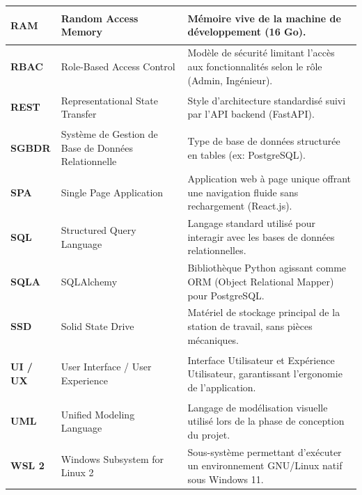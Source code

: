 \documentclass[12pt, a4paper]{report}
\begin{document}
\begin{longtable}{|p{2.5cm}|p{5.5cm}|p{\dimexpr\textwidth-8.8cm}|}
    \hypertarget{acr:30}{}\textbf{RAM} & Random Access Memory & Mémoire vive de la machine de développement (16 Go). \\ \hline
    
    \hypertarget{acr:31}{}\textbf{RBAC} & Role-Based Access Control & Modèle de sécurité limitant l'accès aux fonctionnalités selon le rôle (Admin, Ingénieur). \\ \hline
    
    \hypertarget{acr:32}{}\textbf{REST} & Representational State Transfer & Style d'architecture standardisé suivi par l'API backend (FastAPI). \\ \hline
    
    \hypertarget{acr:33}{}\textbf{SGBDR} & Système de Gestion de Base de Données Relationnelle & Type de base de données structurée en tables (ex: PostgreSQL). \\ \hline
    
    \hypertarget{acr:34}{}\textbf{SPA} & Single Page Application & Application web à page unique offrant une navigation fluide sans rechargement (React.js). \\ \hline
    
    \hypertarget{acr:35}{}\textbf{SQL} & Structured Query Language & Langage standard utilisé pour interagir avec les bases de données relationnelles. \\ \hline
    
    \hypertarget{acr:36}{}\textbf{SQLA} & SQLAlchemy & Bibliothèque Python agissant comme ORM (Object Relational Mapper) pour PostgreSQL. \\ \hline
    
    \hypertarget{acr:37}{}\textbf{SSD} & Solid State Drive & Matériel de stockage principal de la station de travail, sans pièces mécaniques. \\ \hline
    
    \hypertarget{acr:38}{}\textbf{UI / UX} & User Interface / User Experience & Interface Utilisateur et Expérience Utilisateur, garantissant l'ergonomie de l'application. \\ \hline
    
    \hypertarget{acr:39}{}\textbf{UML} & Unified Modeling Language & Langage de modélisation visuelle utilisé lors de la phase de conception du projet. \\ \hline
    
    \hypertarget{acr:40}{}\textbf{WSL 2} & Windows Subsystem for Linux 2 & Sous-système permettant d'exécuter un environnement GNU/Linux natif sous Windows 11. \\ 
\end{longtable}
\end{document}
